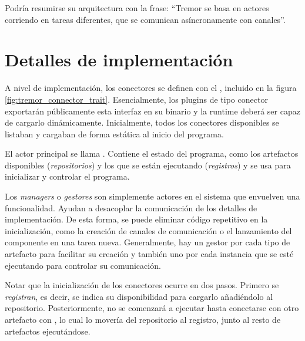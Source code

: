 Podría resumirse su arquitectura con la frase: ``Tremor se basa en actores
corriendo en tareas diferentes, que se comunican asíncronamente con canales''.

\section{Detalles de implementación}

A nivel de implementación, los conectores se definen con el \trait
{}, incluido en la figura \ref{fig:tremor_connector_trait}.
Esencialmente, los plugins de tipo conector exportarán públicamente esta
interfaz en su binario y la runtime deberá ser capaz de cargarlo dinámicamente.
Inicialmente, todos los conectores disponibles se listaban y cargaban de forma
estática al inicio del programa.

El actor principal se llama . Contiene el estado del programa, como
los artefactos disponibles (\emph{repositorios}) y los que se están ejecutando
(\emph{registros}) y se usa para inicializar y controlar el programa.

Los \emph{managers} o \emph{gestores} son simplemente actores en el sistema que
envuelven una funcionalidad. Ayudan a desacoplar la comunicación de los detalles
de implementación. De esta forma, se puede eliminar código repetitivo en la
inicialización, como la creación de canales de comunicación o el lanzamiento del
componente en una tarea nueva. Generalmente, hay un gestor por cada tipo de
artefacto para facilitar su creación y también uno por cada instancia que se
esté ejecutando para controlar su comunicación.

Notar que la inicialización de los conectores ocurre en dos pasos. Primero se
\emph{registran}, es decir, se indica su disponibilidad para cargarlo
añadiéndolo al repositorio. Posteriormente, no se comenzará a ejecutar hasta
conectarse con otro artefacto con , lo cual lo movería del
repositorio al registro, junto al resto de artefactos ejecutándose.


